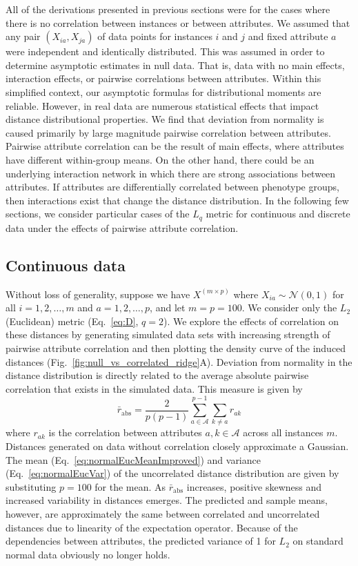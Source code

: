 \documentclass[aos]{imsart}
\begin{document}
All of the derivations presented in previous sections were for the cases where there is no correlation between instances or between attributes. We assumed that any pair $(X_{ia},X_{ja})$ of data points for instances $i$ and $j$ and fixed attribute $a$ were independent and identically distributed. This was assumed in order to determine asymptotic estimates in null data. That is, data with no main effects, interaction effects, or pairwise correlations between attributes. Within this simplified context, our asymptotic formulas for distributional moments are reliable. However, in real data are numerous statistical effects that impact distance distributional properties. We find that deviation from normality is caused primarily by large magnitude pairwise correlation between attributes. Pairwise attribute correlation can be the result of main effects, where attributes have different within-group means. On the other hand, there could be an underlying interaction network in which there are strong associations between attributes. If attributes are differentially correlated between phenotype groups, then interactions exist that change the distance distribution. In the following few sections, we consider particular cases of the $L_q$ metric for continuous and discrete data under the effects of pairwise attribute correlation.

\subsection{Continuous data}

Without loss of generality, suppose we have $X^{(m \times p)}$ where $X_{ia} \sim \mathcal{N}(0,1)$ for all $i=1,2,\dots,m$ and $a=1,2,\dots,p$, and let $m=p=100$. We consider only the $L_2$ (Euclidean) metric (Eq.~\ref{eq:D}, $q=2$). We explore the effects of correlation on these distances by generating simulated data sets with increasing strength of pairwise attribute correlation and then plotting the density curve of the induced distances (Fig.~\ref{fig:null_vs_correlated_ridge}A). Deviation from normality in the distance distribution is directly related to the average absolute pairwise correlation that exists in the simulated data. This measure is given by
%
\begin{equation}\label{eq:abs_corr}
\bar{r}_\text{abs} = \frac{2}{p(p-1)}\sum^{p-1}_{a \in \mathcal{A}} \sum_{k \neq a} r_{ak}
\end{equation}
%
where $r_{ak}$ is the correlation between attributes $a,k \in \mathcal{A}$ across all instances $m$. Distances generated on data without correlation closely approximate a Gaussian. The mean (Eq.~\ref{eq:normalEucMeanImproved}) and variance (Eq.~\ref{eq:normalEucVar}) of the uncorrelated distance distribution are given by substituting $p=100$ for the mean. As $\bar{r}_\text{abs}$ increases, positive skewness and increased variability in distances emerges. The predicted and sample means, however, are approximately the same between correlated and uncorrelated distances due to linearity of the expectation operator. Because of the dependencies between attributes, the predicted variance of 1 for $L_2$ on standard normal data obviously no longer holds. 
\end{document}
